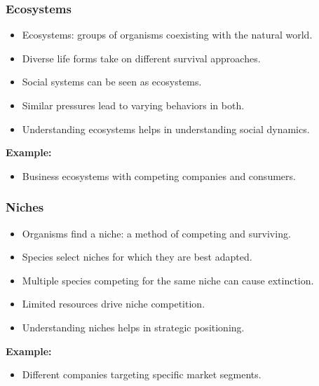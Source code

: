 \begin{frame}[fragile]\frametitle{Ecosystems}
\begin{itemize}
    \item Ecosystems: groups of organisms coexisting with the natural world.
    \item Diverse life forms take on different survival approaches.
    \item Social systems can be seen as ecosystems.
    \item Similar pressures lead to varying behaviors in both.
    \item Understanding ecosystems helps in understanding social dynamics.
\end{itemize}
\textbf{Example:}
\begin{itemize}
    \item Business ecosystems with competing companies and consumers.
\end{itemize}
\end{frame}

\begin{frame}[fragile]\frametitle{Niches}
\begin{itemize}
    \item Organisms find a niche: a method of competing and surviving.
    \item Species select niches for which they are best adapted.
    \item Multiple species competing for the same niche can cause extinction.
    \item Limited resources drive niche competition.
    \item Understanding niches helps in strategic positioning.
\end{itemize}
\textbf{Example:}
\begin{itemize}
    \item Different companies targeting specific market segments.
\end{itemize}
\end{frame}

